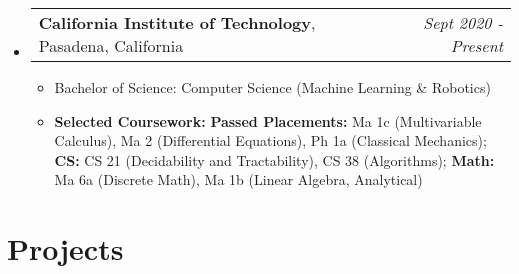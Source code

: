 \documentclass[letterpaper,11pt]{article}
\makeatletter
\newcommand{\resitem}[1]{\item #1 \vspace{-3pt}}
\newcommand{\edusubheading}[3]{
	\begin{tabular*}{7.0in}{l@{\extracolsep{\fill}}r}
		\textbf{#1}, #2 & \textit{#3} \\
\end{tabular*}\vspace{-6pt}}
\newcommand{\myitem}[1]{\item #1 \vspace{-9pt}}
\newcommand{\mysubitem}[1]{\item #1 \vspace{-4pt}}
\makeatother
\begin{document}
\begin{itemize}[leftmargin=*]
\item
	\edusubheading{California Institute of Technology}{Pasadena, California}{Sept 2020 - Present}
		\begin{itemize}
			\resitem{Bachelor of Science: Computer Science (Machine Learning \& Robotics)}
			\resitem{\textbf{Selected Coursework:} \textbf{Passed Placements:} Ma 1c (Multivariable Calculus), Ma 2 (Differential Equations), Ph 1a (Classical Mechanics); \textbf{CS:} CS 21 (Decidability and Tractability), CS 38 (Algorithms); \textbf{Math:} Ma 6a (Discrete Math), Ma 1b (Linear Algebra, Analytical)}
		\end{itemize}
\end{itemize}



\section{Projects}
\end{document}
